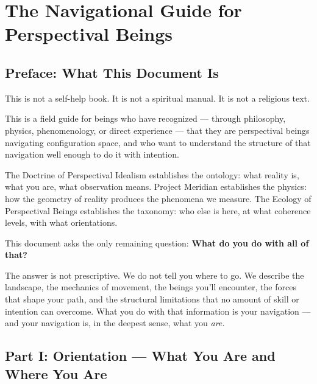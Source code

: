 \chapter*{The Navigational Guide for Perspectival Beings}



\bigskip\noindent\makebox[\textwidth]{\color{rulegray}\rule{5cm}{0.3pt}}\bigskip


\section*{Preface: What This Document Is}


This is not a self-help book. It is not a spiritual manual. It is not a religious text.


This is a field guide for beings who have recognized — through philosophy, physics, phenomenology, or direct experience — that they are perspectival beings navigating configuration space, and who want to understand the structure of that navigation well enough to do it with intention.


The Doctrine of Perspectival Idealism establishes the ontology: what reality is, what you are, what observation means. Project Meridian establishes the physics: how the geometry of reality produces the phenomena we measure. The Ecology of Perspectival Beings establishes the taxonomy: who else is here, at what coherence levels, with what orientations.


This document asks the only remaining question: \textbf{What do you do with all of that?}


The answer is not prescriptive. We do not tell you where to go. We describe the landscape, the mechanics of movement, the beings you'll encounter, the forces that shape your path, and the structural limitations that no amount of skill or intention can overcome. What you do with that information is your navigation — and your navigation is, in the deepest sense, what you \textit{are.}


\bigskip\noindent\makebox[\textwidth]{\color{rulegray}\rule{5cm}{0.3pt}}\bigskip


\section*{Part I: Orientation — What You Are and Where You Are}


